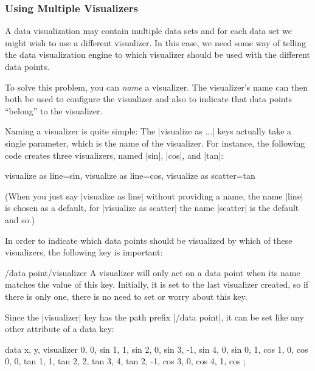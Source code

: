 \subsubsection{Using Multiple Visualizers}

A data visualization may contain multiple data sets and for each data
set we might wish to use a different visualizer. In this case, we need
some way of telling the data visualization engine to which visualizer
should be used with the different data points.

To solve this problem, you can \emph{name} a visualizer. The
visualizer's name can then both be used to configure the visualizer
and also to indicate that data points ``belong'' to the visualizer.

Naming a visualizer is quite simple: The |visualize as ...| keys
actually take a single parameter, which is the name of the
visualizer. For instance, the following code creates three
visualizers, named |sin|, |cos|, and |tan|:

\begin{codeexample}
visualize as line=sin,
visualize as line=cos,
visualize as scatter=tan
\end{codeexample}

(When you just say |visualize as line| without providing a name, the
name |line| is chosen as a default, for |visualize as scatter| the
name |scatter| is the default and so.)

In order to indicate which data points should be visualized by which
of these visualizers, the following key is important:

\begin{key}{/data point/visualizer}
  A visualizer will only act on a data point when its name matches the
  value of this key. Initially, it is set to the last visualizer
  created, so if there is only one, there is no need to set or worry
  about this key.
\end{key}

Since the |visualizer| key has the path prefix |/data point|, it can
be set like any other attribute of a data key:

\begin{codeexample}[width=7cm]
\tikz \datavisualization
 [scientific clean axes,
  visualize as line=sin,
  visualize as line=cos,
  visualize as scatter=tan]
data {
  x, y, visualizer
  0, 0, sin
  1, 1, sin
  2, 0, sin
  3, -1, sin
  4, 0, sin
  0, 1, cos
  1, 0, cos
  0, 0, tan
  1, 1, tan
  2, 2, tan
  3, 4, tan
  2, -1, cos
  3, 0, cos
  4, 1, cos
};
\end{codeexample}

